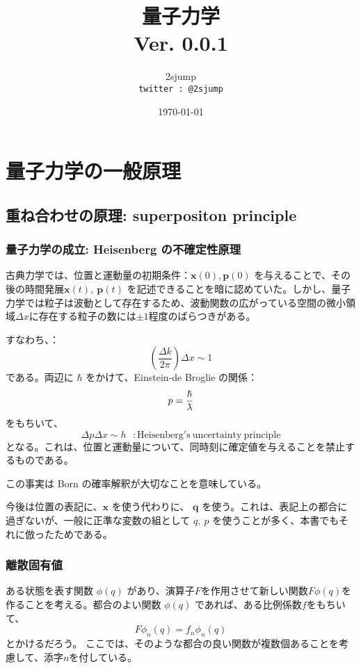 \documentclass[a4j,10pt,oneside,openany]{jsbook}
\title{{\Huge \textbf{量子力学}}\\ {\small Ver. 0.0.1}}
\author{2sjump\\ \texttt{twitter : @2sjump}}
\date{\today}
\newcommand{\lambdabar}{{\mkern0.75mu\mathchar '26\mkern -9.75mu\lambda}}
\begin{document}
\maketitle
\frontmatter
\tableofcontents
\mainmatter

\setcounter{chapter}{-1} %



%
\chapter{量子力学の一般原理}
\section{重ね合わせの原理: superpositon principle}
\subsection{量子力学の成立: Heisenberg の不確定性原理}
古典力学では、位置と運動量の初期条件：$\bm{x}(0), \bm{p}(0)$ を与えることで、その後の時間発展$\bm{x}(t),\ \bm{p}(t)$ を記述できることを暗に認めていた。しかし、量子力学では粒子は波動として存在するため、波動関数の広がっている空間の微小領域$\Delta x$に存在する粒子の数には$\pm 1$程度のばらつきがある。

すなわち、：
\[
	\left( \frac{\Delta k}{2\pi} \right) \Delta x \sim 1
\]
である。両辺に $\hbar$ をかけて、Einstein-de Broglie の関係：
\[
	p = \frac{\hbar}{\lambdabar}
\]
をもちいて、
\[
	\Delta p \Delta x \sim h \ \ \ : \mathrm{Heisenberg's\ uncertainty\  principle}
\]
となる。これは、位置と運動量について、同時刻に確定値を与えることを禁止するものである。

この事実は Born の確率解釈が大切なことを意味している。

今後は位置の表記に、$\bm{x}$ を使う代わりに、 $\bm{q}$ を使う。これは、表記上の都合に過ぎないが、一般に正準な変数の組として $q,\ p$ を使うことが多く、本書でもそれに倣ったためである。

\hrulefill

\subsection{離散固有値}
ある状態を表す関数 $\phi(q)$ があり、演算子$F$を作用させて新しい関数$F\phi(q)$を作ることを考える。都合のよい関数 $\phi(q)$ であれば、ある比例係数$f$をもちいて、
\[ F\phi_n(q) = f_n \phi_n(q)\]
とかけるだろう。 ここでは、そのような都合の良い関数が複数個あることを考慮して、添字$n$を付している。
\end{document}
